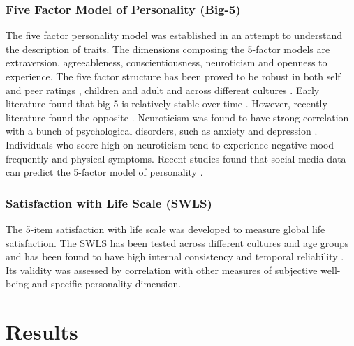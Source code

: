 \subsubsection{Five Factor Model of Personality (Big-5)}
The five factor personality model was established in an attempt to understand the description of traits. The dimensions composing the 5-factor models are extraversion, agreeableness, conscientiousness, neuroticism and openness to experience.  The five factor structure has been proved to be robust in both self and peer ratings \cite{McCrae92}, children and adult \cite{Ivan95} and across different cultures
\cite{McCrae02}. Early literature found that big-5 is relatively stable over time \cite{McCrae92}. However, recently literature found the opposite \cite{Ardelt00}. Neuroticism was found to have strong correlation with a bunch of psychological disorders, such as anxiety and depression \cite{Ormel04}. Individuals who score high on neuroticism tend to experience negative mood frequently and physical symptoms. Recent studies found that social media data can predict the 5-factor model of personality \cite{Kosinski13}. 

\subsubsection{Satisfaction with Life Scale (SWLS)}
The 5-item satisfaction with life scale was developed to measure global life satisfaction. The SWLS has been tested across different cultures and age groups \cite{Diener93} and has been found to have high internal consistency and temporal reliability \cite{Diener85}. Its validity was assessed by correlation with other measures of subjective well-being and specific personality dimension.

\section{Results}

